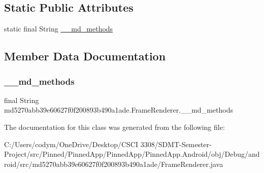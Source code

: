 \subsection*{Static Public Attributes}
\begin{DoxyCompactItemize}
\item 
static final String \hyperlink{classmd5270abb39e60627f0f200893b490a1ade_1_1_frame_renderer_ac9ef5c3ae0c3ecaad8abeb4649d6a402}{\+\_\+\+\_\+md\+\_\+methods}
\end{DoxyCompactItemize}


\subsection{Member Data Documentation}
\mbox{\label{classmd5270abb39e60627f0f200893b490a1ade_1_1_frame_renderer_ac9ef5c3ae0c3ecaad8abeb4649d6a402}} 
\subsubsection{\texorpdfstring{\+\_\+\+\_\+md\+\_\+methods}{\_\_md\_methods}}
{\footnotesize\ttfamily final String md5270abb39e60627f0f200893b490a1ade.\+Frame\+Renderer.\+\_\+\+\_\+md\+\_\+methods\hspace{0.3cm}{\ttfamily [static]}}



The documentation for this class was generated from the following file\+:\begin{DoxyCompactItemize}
\item 
C\+:/\+Users/codym/\+One\+Drive/\+Desktop/\+C\+S\+C\+I 3308/\+S\+D\+M\+T-\/\+Semester-\/\+Project/src/\+Pinned/\+Pinned\+App/\+Pinned\+App/\+Pinned\+App.\+Android/obj/\+Debug/android/src/md5270abb39e60627f0f200893b490a1ade/Frame\+Renderer.\+java\end{DoxyCompactItemize}
